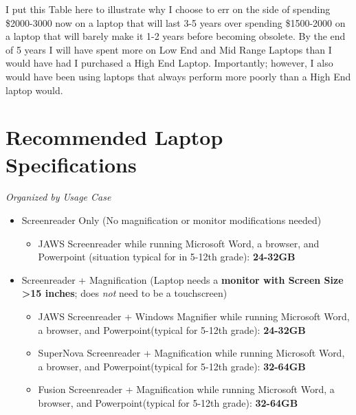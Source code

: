 \documentclass[14pt, letterpaper,twoside]{extreport}
\begin{document}
I put this Table here to illustrate why I choose to err on the side of spending \$2000-3000 now on a laptop that will last 3-5 years over spending \$1500-2000 on a laptop that will barely make it 1-2 years before becoming obsolete. By the end of 5 years I will have spent more on Low End and Mid Range Laptops than I would have had I purchased a High End Laptop. Importantly; however, I also would have been using laptops that always perform more poorly than a High End laptop would.

\pagebreak \hypertarget{minimum-laptop-recommendations}{%
    \section*{Recommended Laptop Specifications}\label{minimum-laptop-recommendations}}

\emph{Organized by Usage Case}

\begin{itemize}
    \item
          Screenreader Only (No magnification or monitor modifications needed)
          
          \begin{itemize}

              \item
                    JAWS Screenreader while running Microsoft Word, a browser, and Powerpoint (situation typical for in 5-12th grade): \textbf{24-32GB}
          \end{itemize}
    \item
          Screenreader + Magnification (Laptop needs a \textbf{monitor with Screen Size \textgreater15 inches}; does \emph{not} need to be a touchscreen)
          
          \begin{itemize}

              \item
                    JAWS Screenreader + Windows Magnifier while running Microsoft Word, a browser, and Powerpoint(typical for 5-12th grade): \textbf{24-32GB}
              \item
                    SuperNova Screenreader + Magnification while running Microsoft Word, a browser, and Powerpoint(typical for 5-12th grade): \textbf{32-64GB}
              \item
                    Fusion Screenreader + Magnification while running Microsoft Word, a browser, and Powerpoint(typical for 5-12th grade): \textbf{32-64GB}
          \end{itemize}
\end{itemize}
\end{document}
